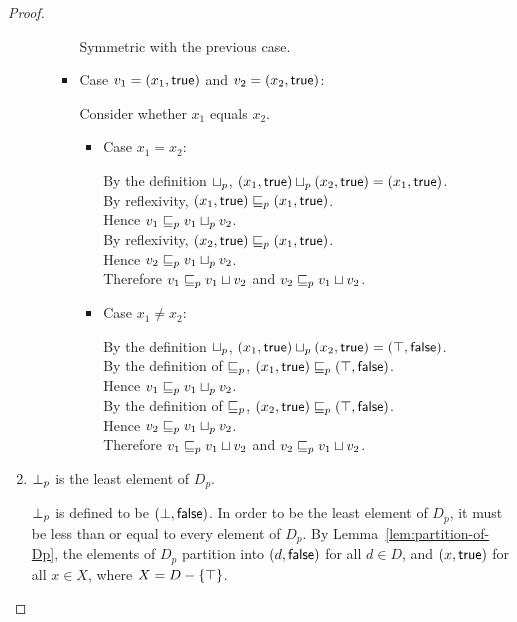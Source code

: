 \begin{proof}
\begin{enumerate}
\begin{enumerate}
\begin{itemize}
          Symmetric with the previous case. 
        \item Case $v_1 = (x_1, \textsf{true})$ and $v_2 = (x_2, \textsf{true})$:

          Consider whether $x_1$ equals $x_2$. 
          \begin{itemize}
            \item Case $x_1 = x_2$:
  
              By the definition $ \sqcup_p $, $(x_1, \textsf{true})  \sqcup_p  (x_2, \textsf{true}) = (x_1, \textsf{true})$. \\ 
              By reflexivity, $(x_1, \textsf{true}) \sqsubseteq_p (x_1, \textsf{true})$. \\ 
              Hence $v_1 \sqsubseteq_p v_1 \sqcup_p v_2$. \\ 
              By reflexivity, $(x_2, \textsf{true}) \sqsubseteq_p (x_1, \textsf{true})$. \\ 
              Hence $v_2 \sqsubseteq_p v_1 \sqcup_p v_2$. \\ 
              Therefore $v_1 \sqsubseteq_p v_1  \sqcup  v_2$ and $v_2 \sqsubseteq_p v_1  \sqcup  v_2$. 

            \item Case $x_1 \not= x_2$: 

              By the definition $ \sqcup_p $, $(x_1, \textsf{true})  \sqcup_p  (x_2, \textsf{true}) = (\top, \textsf{false})$. \\ 
              By the definition of $\sqsubseteq_p$, $(x_1, \textsf{true}) \sqsubseteq_p (\top, \textsf{false})$. \\
              Hence $v_1 \sqsubseteq_p v_1 \sqcup_p v_2$. \\ 
              By the definition of $\sqsubseteq_p$, $(x_2, \textsf{true}) \sqsubseteq_p (\top, \textsf{false})$. \\
              Hence $v_2 \sqsubseteq_p v_1 \sqcup_p v_2$. \\ 
              Therefore $v_1 \sqsubseteq_p v_1  \sqcup  v_2$ and $v_2 \sqsubseteq_p v_1  \sqcup  v_2$. 
          \end{itemize}
    \end{itemize}
  \end{enumerate}

\item $\bot_{p}$ is the least element of $D_p$. 

$\bot_{p}$ is defined to be $(\bot, \textsf{false})$.  In order to be the
  least element of $D_p$, it must be less than or equal to every
  element of $D_p$.  By Lemma~\ref{lem:partition-of-Dp}, the elements
  of $D_p$ partition into $(d, \textsf{false})$ for all $d \in D$, and
  $(x, \textsf{true})$ for all $x \in X$, where $X = D - \left\{\top\right\}$.


\end{enumerate}
\end{proof}
